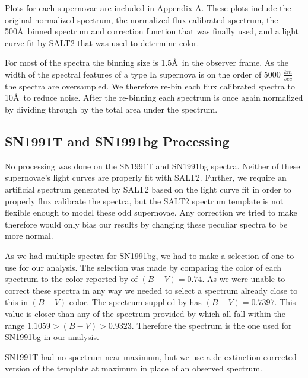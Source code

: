 Plots for each supernovae are included in Appendix A. These plots include the original normalized spectrum, the normalized flux calibrated spectrum, the 500\AA\ binned spectrum and correction function that was finally used, and a light curve fit by SALT2 that was used to determine color.

For most of the spectra the binning size is 1.5\AA\ in the observer frame. As the width of the spectral features of a type Ia supernova is on the order of 5000 $\frac{km}{sec}$ the spectra are oversampled. We therefore re-bin each flux calibrated spectra to 10\AA\ to reduce noise. After the re-binning each spectrum is once again normalized by dividing through by the total area under the spectrum.

\subsection{SN1991T and SN1991bg Processing} %
No processing was done on the SN1991T and SN1991bg spectra. Neither of these supernovae's light curves are properly fit with SALT2. Further, we require an artificial spectrum generated by SALT2 based on the light curve fit in order to properly flux calibrate the spectra, but the SALT2 spectrum template is not flexible enough to model these odd supernovae. Any correction we tried to make therefore would only bias our results by changing these peculiar spectra to be more normal.

As we had multiple spectra for SN1991bg, we had to make a selection of one to use for our analysis. The selection was made by comparing the color of each spectrum to the color reported by \cite{turatto96b} of $(B-V) = 0.74$. As we were unable to correct these spectra in any way we needed to select a spectrum already close to this in $(B-V)$ color. The spectrum supplied by \cite{gomez96a} has $(B-V) = 0.7397$. This value is closer than any of the spectrum provided by \cite{turatto96b} which all fall within the range $1.1059 > (B-V) > 0.9323$. Therefore the \citeauthor{gomez96a} spectrum is the one used for SN1991bg in our analysis.

SN1991T had no spectrum near maximum, but we use a de-extinction-corrected version of the \citeauthor{nugent02a} template at maximum in place of an observed spectrum.
